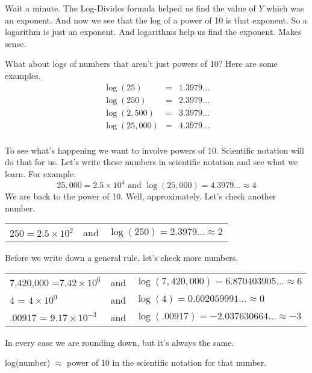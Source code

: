 Wait a minute.  The Log-Divides formula helped us find the value of $Y$ which was an exponent.   And now we see that the log of a power of 10 is that exponent.  So a logarithm is just an exponent. And logarithms help us find the exponent.  Makes sense.

What about logs of numbers that aren't just powers of 10? Here are some examples.
\begin{eqnarray*}
\log (25) & = & 1.3979\ldots \\
\log (250) & = & 2.3979\ldots \\
\log (2,500) & = & 3.3979\ldots \\
\log (25,000) & = & 4.3979\ldots \\
\end{eqnarray*}
\vspace{-.5in} %

To see what's happening we want to involve powers of 10.  Scientific notation will do that for us.  Let's write these numbers in scientific notation and see what we learn.  For example.
$$ 25,000 = 2.5 \times 10^4 \text{ and } \log( 25,000)=4.3979\ldots \approx 4$$
We are back to the power of 10.  Well, approximately.  Let's check another number.
\begin{center}
\begin{tabular} {lcl}
$250=2.5 \times 10^2$ & and & $\log(250)=2.3979\ldots \approx 2$ \\
\end{tabular}
\end{center}

Before we write down a general rule, let's check more numbers.
\begin{center}
\begin{tabular} {lcl}
7,420,000 =$7.42 \times 10^6$ & and & $\log(7,420,000)=6.870403905\ldots \approx 6$ \\
4 = $4 \times 10^0$ & and & $\log (4)=0.602059991\ldots \approx 0$ \\
.00917 =  $9.17 \times 10^{-3}$ & and & $\log (.00917)=-2.037630664\ldots \approx -3$\\
\end{tabular}
\end{center}
In every case we are rounding down, but it's always the same.

\begin{center}
log(number) $\approx$ power of 10 in the scientific notation for that number.
\end{center}

